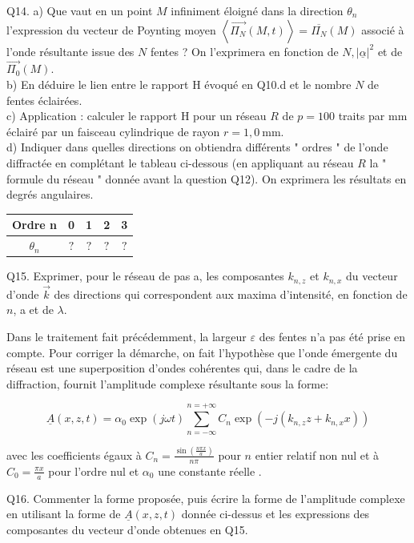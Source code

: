 \documentclass[10pt]{article}
\begin{document}
Q14. a) Que vaut en un point \(M\) infiniment éloigné dans la direction \(\theta_{n}\) l'expression du vecteur de Poynting moyen \(\left\langle\overrightarrow{\Pi_{N}}(M, t)\right\rangle=\overline{\Pi_{N}}(M)\) associé à l'onde résultante issue des \(N\) fentes ? On l'exprimera en fonction de \(N,|\underline{\alpha}|^{2}\) et de \(\overrightarrow{\Pi_{0}}(M)\).\\
b) En déduire le lien entre le rapport H évoqué en Q10.d et le nombre \(N\) de fentes éclairées.\\
c) Application : calculer le rapport H pour un réseau \(R\) de \(p=100\) traits par mm éclairé par un faisceau cylindrique de rayon \(r=1,0 \mathrm{~mm}\).\\
d) Indiquer dans quelles directions on obtiendra différents " ordres " de l'onde diffractée en complétant le tableau ci-dessous (en appliquant au réseau \(R\) la " formule du réseau " donnée avant la question Q12). On exprimera les résultats en degrés angulaires.

\begin{center}
\begin{tabular}{|c|c|c|c|c|}
\hline
Ordre n & 0 & 1 & 2 & 3 \\
\hline
\(\theta_{n}\) & \(?\) & \(?\) & \(?\) & \(?\) \\
\hline
\end{tabular}
\end{center}

Q15. Exprimer, pour le réseau de pas a, les composantes \(k_{n, z}\) et \(k_{n, x}\) du vecteur d'onde \(\vec{k}\) des directions qui correspondent aux maxima d'intensité, en fonction de \(n\), a et de \(\lambda\).

Dans le traitement fait précédemment, la largeur \(\varepsilon\) des fentes n'a pas été prise en compte. Pour corriger la démarche, on fait l'hypothèse que l'onde émergente du réseau est une superposition d'ondes cohérentes qui, dans le cadre de la diffraction, fournit l'amplitude complexe résultante sous la forme:

\[
\underline{A}(x, z, t)=\alpha_{0} \exp (j \omega t) \sum_{n=-\infty}^{n=+\infty} C_{n} \exp \left(-j\left(k_{n, z} z+k_{n, x} x\right)\right)
\]

avec les coefficients égaux à \(C_{n}=\frac{\sin \left(\frac{n \pi x}{a}\right)}{n \pi}\) pour \(n\) entier relatif non nul et à \(C_{0}=\frac{\pi x}{a}\) pour l'ordre nul et \(\alpha_{0}\) une constante réelle .

Q16. Commenter la forme proposée, puis écrire la forme de l'amplitude complexe en utilisant la forme de \(\underline{A}(x, z, t)\) donnée ci-dessus et les expressions des composantes du vecteur d'onde obtenues en Q15.
\end{document}
